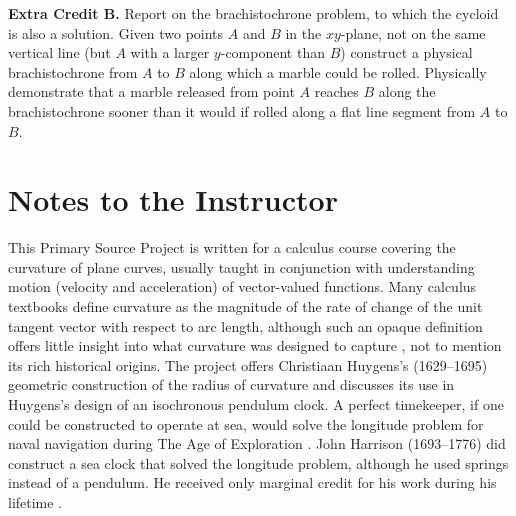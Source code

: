 \documentclass[12pt]{article}
\theoremstyle{definition}
\begin{document}
\bigskip
\noindent
{\bf{Extra Credit B.}}  Report on the brachistochrone problem, to
which the cycloid is also a solution.  Given two points $A$ and $B$ in
the $xy$-plane, not on the same vertical line (but $A$ with a larger
$y$-component than $B$) construct a physical
brachistochrone from $A$ to $B$ along which a marble could be rolled.
Physically demonstrate that a marble released from point $A$ reaches
$B$ along the brachistochrone sooner than it would if rolled along a
flat line segment from $A$ to $B$.
  

\vfill
\eject
\section*{Notes to the Instructor}

This Primary Source Project is written for a calculus course covering the curvature
of plane curves, usually taught in conjunction with understanding
motion (velocity and acceleration) of vector-valued functions.  Many
calculus textbooks define curvature as the magnitude of the rate of
change of the unit tangent vector with respect to arc length, although
such an opaque definition offers little insight into what curvature
was designed to capture \cite{Lodder}, not to mention its rich historical origins.
The project offers Christiaan Huygens's (1629--1695) geometric
construction of the radius of curvature and discusses its use in
Huygens's design of an isochronous pendulum clock.  A perfect
timekeeper, if one could be constructed to operate at sea, would
solve the longitude problem for naval navigation during The Age of
Exploration \cite{Sobel}.   John Harrison (1693--1776) did construct a
sea clock that solved the longitude problem, although he used springs
instead of a pendulum.  He received only marginal credit for his work
during his lifetime \cite{Sobel}.  
\end{document}

